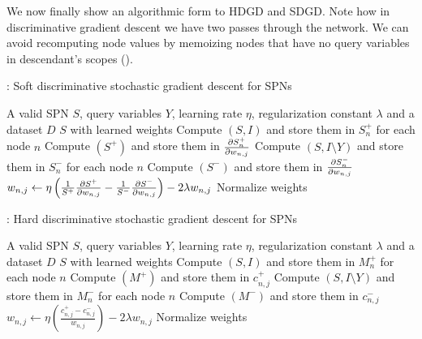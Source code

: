 We now finally show an algorithmic form to HDGD and SDGD\@. Note how in discriminative gradient
descent we have two passes through the network. We can avoid recomputing node values by memoizing
nodes that have no query variables in descendant's scopes (\cite{discriminative}).

\begin{algorithm}[H]
  \caption{: Soft discriminative stochastic gradient descent for
    SPNs\label{alg:disc_soft_gd}}
  \begin{algorithmic}[1]
    \Require A valid SPN $S$, query variables $Y$, learning rate $\eta$, regularization constant
      $\lambda$ and a dataset $D$
    \Ensure $S$ with learned weights
    \Repeat%
        \State Compute $(S, I)$ and store them in $S^+_n$ for each node $n$
        \State Compute $(S^+)$ and store them in $\frac{\partial S^+_n}{\partial w_{n,j}}$
        \State Compute $(S, I\setminus Y)$ and store them in $S^-_n$ for each
          node $n$
        \State Compute $(S^-)$ and store them in $\frac{\partial S^-_n}{\partial w_{n,j}}$
          \State $w_{n,j}\gets\eta\left(\frac{1}{S^+}\frac{\partial S^+}{\partial w_{n,j}}-\frac{1}{S^-}
            \frac{\partial S^-}{\partial w_{n,j}}\right)-2\lambda w_{n,j}$
        \EndFor%
        \State Normalize weights
      \EndFor%
  \end{algorithmic}
\end{algorithm}

\begin{algorithm}[H]
  \caption{: Hard discriminative stochastic gradient descent for
    SPNs\label{alg:disc_hard_gd}}
  \begin{algorithmic}[1]
    \Require A valid SPN $S$, query variables $Y$, learning rate $\eta$, regularization constant
      $\lambda$ and a dataset $D$
    \Ensure $S$ with learned weights
    \Repeat%
        \State Compute $(S, I)$ and store them in $M^+_n$ for each node $n$
        \State Compute $(M^+)$ and store them in $c^+_{n,j}$
        \State Compute $(S, I\setminus Y)$ and store them in $M^-_n$ for each
          node $n$
        \State Compute $(M^-)$ and store them in $c^-_{n,j}$
          \State $w_{n,j}\gets\eta\left(\frac{c^+_{n,j}-c^-_{n,j}}{w_{n,j}}\right)-2\lambda w_{n,j}$
        \EndFor%
        \State Normalize weights
      \EndFor%
  \end{algorithmic}
\end{algorithm}
